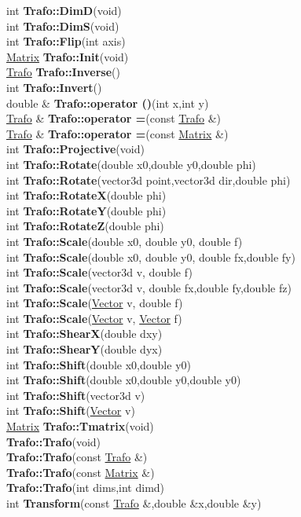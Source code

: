 \documentclass[10pt,titlepage]{article}
\def\functionlistentry#1#2#3#4#5#6{\noindent #1 {\bf #2}(#3) \dotfill #6\\}
\begin{document}
{{\functionlistentry{int}{Trafo::DimD}{void}{690}{geoTrafo}{}
\functionlistentry{int}{Trafo::DimS}{void}{689}{geoTrafo}{}
\functionlistentry{int}{Trafo::Flip}{int axis}{704}{geoTrafo}{}
\functionlistentry{\hyperlink{Matrix}{Matrix}}{Trafo::Init}{void}{692}{geoTrafo}{}
\functionlistentry{\hyperlink{Trafo}{Trafo}}{Trafo::Inverse}{}{694}{geoTrafo}{}
\functionlistentry{int}{Trafo::Invert}{}{693}{geoTrafo}{}
\functionlistentry{double \&}{Trafo::operator ()}{int x,int y}{686}{geoTrafo}{}
\functionlistentry{\hyperlink{Trafo}{Trafo} \&}{Trafo::operator =}{const \hyperlink{Trafo}{Trafo} \&}{684}{geoTrafo}{}
\functionlistentry{\hyperlink{Trafo}{Trafo} \&}{Trafo::operator =}{const \hyperlink{Matrix}{Matrix} \&}{685}{geoTrafo}{}
\functionlistentry{int}{Trafo::Projective}{void}{713}{geoTrafo}{}
\functionlistentry{int}{Trafo::Rotate}{double x0,double y0,double phi}{699}{geoTrafo}{}
\functionlistentry{int}{Trafo::Rotate}{vector3d point,vector3d dir,double phi}{700}{geoTrafo}{}
\functionlistentry{int}{Trafo::RotateX}{double phi}{701}{geoTrafo}{}
\functionlistentry{int}{Trafo::RotateY}{double phi}{702}{geoTrafo}{}
\functionlistentry{int}{Trafo::RotateZ}{double phi}{703}{geoTrafo}{}
\functionlistentry{int}{Trafo::Scale}{double x0, double y0, double f}{707}{geoTrafo}{}
\functionlistentry{int}{Trafo::Scale}{double x0, double y0, double fx,double fy}{708}{geoTrafo}{}
\functionlistentry{int}{Trafo::Scale}{vector3d v, double f}{709}{geoTrafo}{}
\functionlistentry{int}{Trafo::Scale}{vector3d v, double fx,double fy,double fz}{710}{geoTrafo}{}
\functionlistentry{int}{Trafo::Scale}{\hyperlink{Vector}{Vector} v, double f}{711}{geoTrafo}{}
\functionlistentry{int}{Trafo::Scale}{\hyperlink{Vector}{Vector} v, \hyperlink{Vector}{Vector} f}{712}{geoTrafo}{}
\functionlistentry{int}{Trafo::ShearX}{double dxy}{705}{geoTrafo}{}
\functionlistentry{int}{Trafo::ShearY}{double dyx}{706}{geoTrafo}{}
\functionlistentry{int}{Trafo::Shift}{double x0,double y0}{695}{geoTrafo}{}
\functionlistentry{int}{Trafo::Shift}{double x0,double y0,double y0}{696}{geoTrafo}{}
\functionlistentry{int}{Trafo::Shift}{vector3d v}{697}{geoTrafo}{}
\functionlistentry{int}{Trafo::Shift}{\hyperlink{Vector}{Vector} v}{698}{geoTrafo}{}
\functionlistentry{\hyperlink{Matrix}{Matrix}}{Trafo::Tmatrix}{void}{691}{geoTrafo}{}
\functionlistentry{}{Trafo::Trafo}{void}{680}{geoTrafo}{}
\functionlistentry{}{Trafo::Trafo}{const \hyperlink{Trafo}{Trafo} \&}{681}{geoTrafo}{}
\functionlistentry{}{Trafo::Trafo}{const \hyperlink{Matrix}{Matrix} \&}{682}{geoTrafo}{}
\functionlistentry{}{Trafo::Trafo}{int dims,int dimd}{683}{geoTrafo}{}
\functionlistentry{int}{Transform}{const \hyperlink{Trafo}{Trafo} \&,double \&x,double \&y}{714}{geoTrafo}{}
}}
\end{document}
